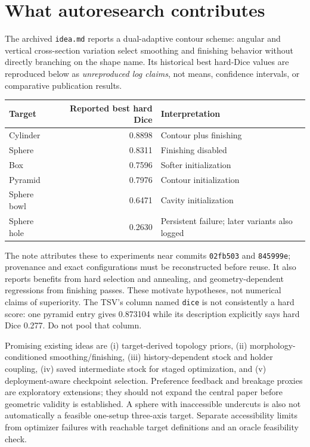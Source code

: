 \documentclass[11pt]{article}
\begin{document}
\section{What autoresearch contributes}
The archived \texttt{idea.md} reports a dual-adaptive contour scheme: angular
and vertical cross-section variation select smoothing and finishing behavior
without directly branching on the shape name. Its historical best hard-Dice
values are reproduced below as \emph{unreproduced log claims}, not means,
confidence intervals, or comparative publication results.
\begin{center}
\begin{tabular}{lrl}
\toprule Target & Reported best hard Dice & Interpretation\\\midrule
Cylinder & 0.8898 & Contour plus finishing\\
Sphere & 0.8311 & Finishing disabled\\
Box & 0.7596 & Softer initialization\\
Pyramid & 0.7976 & Contour initialization\\
Sphere bowl & 0.6471 & Cavity initialization\\
Sphere hole & 0.2630 & Persistent failure; later variants also logged\\\bottomrule
\end{tabular}
\end{center}
The note attributes these to experiments near commits \texttt{02fb503} and
\texttt{845999e}; provenance and exact configurations must be reconstructed
before reuse. It also reports benefits from hard selection and annealing, and
geometry-dependent regressions from finishing passes. These motivate hypotheses,
not numerical claims of superiority. The TSV's column named \texttt{dice}
is not consistently a hard score: one pyramid entry gives 0.873104 while its
description explicitly says hard Dice 0.277. Do not pool that column.

Promising existing ideas are (i) target-derived topology priors, (ii) morphology-
conditioned smoothing/finishing, (iii) history-dependent stock and holder coupling,
(iv) saved intermediate stock for staged optimization, and (v) deployment-aware
checkpoint selection. Preference feedback and breakage proxies are exploratory
extensions; they should not expand the central paper before geometric validity
is established. A sphere with inaccessible undercuts is also not automatically
a feasible one-setup three-axis target. Separate accessibility limits from
optimizer failures with reachable target definitions and an oracle feasibility
check.
\end{document}
